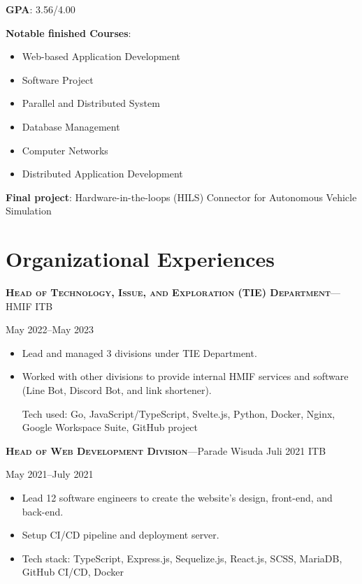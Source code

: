 \documentclass[10pt]{article}
\newcommand{\workExpVspace}{1em}
\newcommand{\orgExp}[5]{
    \noindent \textbf{\textsc{#1}}---#2

    {#3}--{#4}

    {#5}
    \vspace{\workExpVspace}
}
\begin{document}
\textbf{GPA}: 3.56/4.00

\textbf{Notable finished Courses}:
\begin{multicols}{2}
    \begin{itemize}
        \item Web-based Application Development
        \item Software Project
        \item Parallel and Distributed System
        \item Database Management
        \item Computer Networks
        \item Distributed Application Development
    \end{itemize}
\end{multicols}

\textbf{Final project}: Hardware-in-the-loops (HILS) Connector for Autonomous Vehicle Simulation

\section{Organizational Experiences}

\orgExp
    {Head of Technology, Issue, and Exploration (TIE) Department}
    {HMIF ITB}
    {May 2022}
    {May 2023}
    {
        \begin{itemize}
            \item Lead and managed 3 divisions under TIE Department.
            \item Worked with other divisions to provide internal HMIF services and software (Line
                Bot, Discord Bot, and link shortener).

                Tech used: Go, JavaScript/TypeScript, Svelte.js, Python, Docker, Nginx, Google
                Workspace Suite, GitHub project
        \end{itemize}
    }
    
\orgExp
{Head of Web Development Division}
{Parade Wisuda Juli 2021 ITB}
{May 2021}
{July 2021}
{
    \begin{itemize}
        \item Lead 12 software engineers to create the website's design, front-end, and back-end.
        \item Setup CI/CD pipeline and deployment server.
        \item Tech stack: TypeScript, Express.js, Sequelize.js, React.js, SCSS, MariaDB, GitHub
            CI/CD, Docker
    \end{itemize}
}
\end{document}
